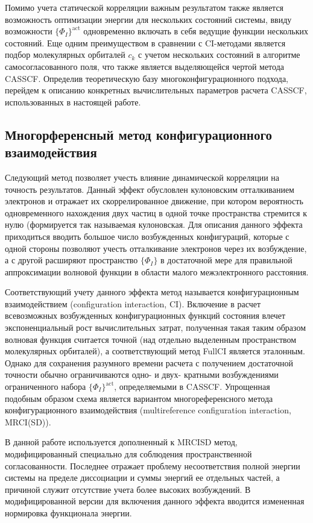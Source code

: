 \documentclass[12pt]{extarticle}
\begin{document}
    Помимо учета статической корреляции важным результатом также является возможность оптимизации энергии для нескольких состояний системы, ввиду возможности $\{ \Phi_I \}^\text{act}$ одновременно включать в себя ведущие функции нескольких состояний. Еще одним преимуществом в сравнении с CI-методами является подбор молекулярных орбиталей $c_k$ с учетом нескольких состояний в алгоритме самосогласованного поля, что также является выделяющейся чертой метода CASSCF. Определив теоретическую базу многоконфигурационного подхода, перейдем к описанию конкретных вычислительных параметров расчета CASSCF, использованных в настоящей работе.
    
    \subsection{Многорференсный метод конфигурационного взаимодействия}
    \label{sec:Chapter1.3}
    
    Следующий метод позволяет учесть влияние динамической корреляции на точность результатов. Данный эффект обусловлен кулоновским отталкиванием электронов и отражает их скоррелированное движение, при котором вероятность одновременного нахождения двух частиц в одной точке пространства стремится к нулю (формируется так называемая кулоновская. Для описания данного эффекта приходиться вводить большое число возбужденных конфигураций, которые с одной стороны позволяют учесть отталкивание электронов через их возбуждение, а с другой расширяют пространство $\{ \Phi_I \}$ в достаточной мере для правильной аппроксимации волновой функции в области малого межэлектронного расстояния.
    
    Соответствующий учету данного эффекта метод называется конфигурационным взаимодействием (configuration interaction, CI). Включение в расчет всевозможных возбужденных конфигурационных функций состояния влечет экспоненциальный рост вычислительных затрат, полученная такая таким образом волновая функция считается точной (над отдельно выделенным пространством молекулярных орбиталей), а соответствующий метод FullCI является эталонным. Однако для сохранения разумного времени расчета с получением достаточной точности обычно ограничиваются одно- и двух- кратными возбуждениями ограниченного набора $\{ \Phi_I \}^\text{act}$, определяемыми в CASSCF. Упрощенная подобным образом схема является вариантом многореференсного метода конфигурационного взаимодействия (multireference configuration interaction, MRCI(SD)).
    
    В данной работе используется дополненный к MRCISD метод, модифицированный специально для соблюдения пространственной согласованности. Последнее отражает проблему несоответствия полной энергии системы на пределе диссоциации и суммы энергий ее отдельных частей, а причиной служит отсутствие учета более высоких возбуждений. В модифицированной версии для включения данного эффекта вводится измененная нормировка функционала энергии.
    
\end{document}
